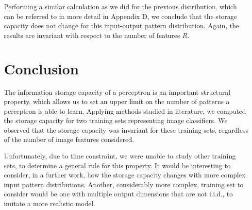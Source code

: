\documentclass[a4paper, 11pt]{article}
\begin{document}
Performing a similar calculation as we did for the previous distribution, which can be referred to in more detail in Appendix D, we conclude that the storage capacity does not change for this input-output pattern distribution. Again, the results are invariant with respect to the number of features $R$.

\section{Conclusion}
The information storage capacity of a perceptron is an important structural property, which allows us to set an upper limit on the number of patterns a perceptron is able to learn. Applying methods studied in literature, we computed the storage capacity for two training sets representing image classifiers. We observed that the storage capacity was invariant for these training sets, regardless of the number of image features considered.

Unfortunately, due to time constraint, we were unable to study other training sets, to determine a general rule for this property. It would be interesting to consider, in a further work, how the storage capacity changes with more complex input pattern distributions. Another, considerably more complex, training set to consider would be one with multiple output dimensions that are not i.i.d., to imitate a more realistic model.

\newpage



\vspace{-0.5cm}





\newpage



\newpage


\end{document}
